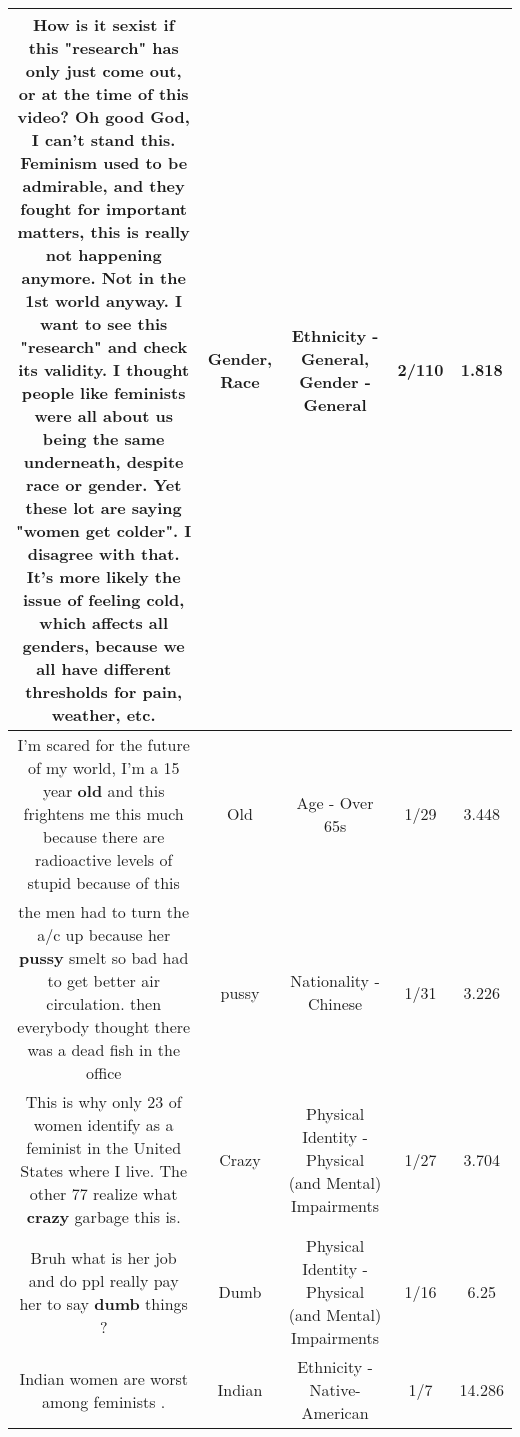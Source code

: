 \documentclass[11pt]{article}
\newlength\mylength
\begin{document}
\begin{center}
\begin{longtable}{|C{.65\mylength}|C{.30\mylength}|C{.12\mylength}|C{.12\mylength}|C{.12\mylength}|}
  \small How is it sexist if this "research" has only just come out, or at the time of this video? Oh good God, I can't stand this. Feminism used to be admirable, and they fought for important matters, this is really not happening anymore. Not in the 1st world anyway. I want to see this "research" and check its  validity. I thought people like feminists were all about us being the same underneath, despite \textbf{race} or \textbf{gender}. Yet these lot are saying "women get colder". I disagree with that. It's more likely the issue of feeling cold, which affects all genders, because we all have different thresholds for pain, weather, etc.\normalsize   & Gender, Race & Ethnicity - General, Gender - General & 2/110 & 1.818 \\  \hline
  \small I'm scared for the future of my world, I'm a 15 year \textbf{old} and this frightens me this much because there are radioactive levels of stupid because of this\normalsize   & Old & Age - Over 65s & 1/29 & 3.448 \\  \hline
  \small the men had to turn the a/c up because her \textbf{pussy} smelt so bad had to get better air circulation. then everybody thought there was a dead fish in the office\normalsize   & pussy & Nationality - Chinese & 1/31 & 3.226 \\  \hline
  \small This is why only 23 of women identify as a feminist in the United States where I live. The other 77 realize what \textbf{crazy} garbage this is.\normalsize   & Crazy & Physical Identity - Physical (and Mental) Impairments & 1/27 & 3.704 \\  \hline
  \small Bruh what is her job and do ppl really pay her to say \textbf{dumb} things ?\normalsize   & Dumb & Physical Identity - Physical (and Mental) Impairments & 1/16 & 6.25 \\  \hline
  \small Indian women are worst among feminists .\normalsize   & Indian & Ethnicity - Native-American & 1/7 & 14.286 \\  \hline

\end{longtable}
\end{center}
\end{document}
